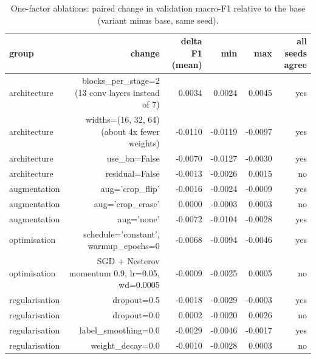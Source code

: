 \begin{table}[t]
\centering
\caption{One-factor ablations: paired change in validation macro-F1 relative to the base (variant minus base, same seed).}
\label{tab:p2_ablation_deltas}
\footnotesize
\begin{tabular}{lrrrrr}
\toprule
group & change & delta F1 (mean) & min & max & all seeds agree \\
\midrule
architecture & blocks\_per\_stage=2 (13 conv layers instead of 7) & 0.0034 & 0.0024 & 0.0045 & yes \\
architecture & widths=(16, 32, 64) (about 4x fewer weights) & -0.0110 & -0.0119 & -0.0097 & yes \\
architecture & use\_bn=False & -0.0070 & -0.0127 & -0.0030 & yes \\
architecture & residual=False & -0.0013 & -0.0026 & 0.0015 & no \\
augmentation & aug='crop\_flip' & -0.0016 & -0.0024 & -0.0009 & yes \\
augmentation & aug='crop\_erase' & 0.0000 & -0.0003 & 0.0003 & no \\
augmentation & aug='none' & -0.0072 & -0.0104 & -0.0028 & yes \\
optimisation & schedule='constant', warmup\_epochs=0 & -0.0068 & -0.0094 & -0.0046 & yes \\
optimisation & SGD + Nesterov momentum 0.9, lr=0.05, wd=0.0005 & -0.0009 & -0.0025 & 0.0005 & no \\
regularisation & dropout=0.5 & -0.0018 & -0.0029 & -0.0003 & yes \\
regularisation & dropout=0.0 & 0.0002 & -0.0020 & 0.0026 & no \\
regularisation & label\_smoothing=0.0 & -0.0029 & -0.0046 & -0.0017 & yes \\
regularisation & weight\_decay=0.0 & -0.0010 & -0.0028 & 0.0003 & no \\
\bottomrule
\end{tabular}
\end{table}
